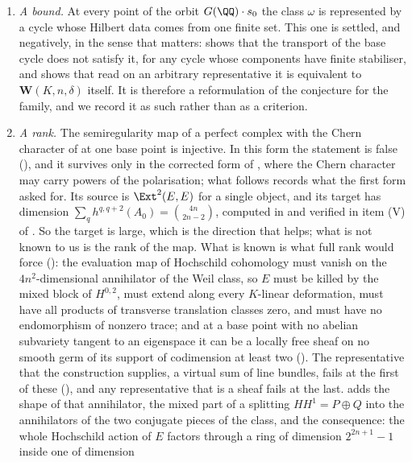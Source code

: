 \begin{remark}
\begin{enumerate}[label=\textup{(P\arabic*)},leftmargin=*]
\item \emph{A bound.} At every point of the orbit $G(\QQ)\cdot s_{0}$ the
  class $\omega$ is represented by a cycle whose Hilbert data comes from one
  finite set. This one is settled, and negatively, in the sense that matters:
   shows that the transport of the base cycle does not
  satisfy it, for any cycle whose components have finite stabiliser, and
   shows that read on an arbitrary representative it is
  equivalent to $\mathbf{W}(K,n,\delta)$ itself. It is therefore a
  reformulation of the conjecture for the family, and we record it as such
  rather than as a criterion.
\item \emph{A rank.} The semiregularity map of a perfect complex with the
  Chern character of  at one base point is injective.
  In this form the statement is false (), and it survives
  only in the corrected form of , where the Chern
  character may carry powers of the polarisation; what follows records what
  the first form asked for. Its
  source is $\Ext^{2}(E,E)$ for a single object, and its target has dimension
  $\sum_{q}h^{q,q+2}(A_{0})=\binom{4n}{2n-2}$, computed in
   and verified in item (V) of
  . So the target is large, which is the direction that
  helps; what is not known to us is the rank of the map. What is known is
  what full rank would force (): the evaluation map of
  Hochschild cohomology must vanish on the $4n^{2}$-dimensional annihilator of
  the Weil class, so $E$ must be killed by the mixed block of $H^{0,2}$, must
  extend along every $K$-linear deformation, must have all products of
  transverse translation classes zero, and must have no endomorphism of
  nonzero trace; and at a base point with no abelian subvariety tangent to an
  eigenspace it can be a locally free sheaf on no smooth germ of its support
  of codimension at least two (). The representative that
  the construction supplies, a virtual sum of line bundles, fails at the first
  of these (), and any representative that is a
  sheaf fails at the last.  adds the shape of that
  annihilator, the mixed part of a splitting $HH^{1}=P\oplus Q$ into the
  annihilators of the two conjugate pieces of the class, and
   the consequence: the whole Hochschild action of $E$
  factors through a ring of dimension $2^{2n+1}-1$ inside one of dimension

\end{enumerate}
\end{remark}
